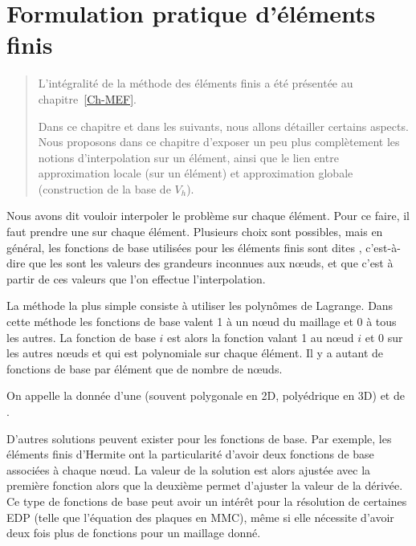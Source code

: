 \chapter{Formulation pratique d'éléments finis \pln}\label{Ch-Elts}
\begin{abstract}
L'intégralité de la méthode des éléments finis a été présentée au chapitre~\ref{Ch-MEF}.

Dans ce chapitre et dans les suivants, nous allons détailler certains aspects.
Nous proposons dans ce chapitre d'exposer un peu plus complètement les notions
d'interpolation sur un élément, ainsi que le lien entre approximation locale
(sur un élément) et approximation globale (construction de la base de $V_h$).
\end{abstract}


Nous avons dit vouloir interpoler le problème sur chaque élément.
Pour ce faire, il faut prendre une  sur chaque élément.
Plusieurs choix sont possibles, mais en général, les fonctions de base utilisées pour les
éléments finis sont dites , c'est-à-dire que les
 sont les valeurs des grandeurs inconnues aux nœuds,
et que c'est à partir de ces valeurs que l'on effectue l'interpolation.

\medskip
La méthode la plus simple consiste à utiliser les polynômes de Lagrange.
Dans cette méthode les fonctions de base valent 1 à un nœud du maillage et 0 à tous les autres.
La fonction de base $i$ est alors la fonction valant 1 au nœud $i$ et 0 sur les autres nœuds
et qui est polynomiale sur chaque élément.
Il y a autant de fonctions de base par élément que de nombre de nœuds.

On appelle  la donnée d'une 
(souvent polygonale en 2D, polyédrique en 3D) et de .

\medskip
D'autres solutions peuvent exister pour les fonctions de base.
Par exemple, les éléments finis d'Hermite
ont la particularité d'avoir deux fonctions de base associées à chaque nœud.
La valeur de la solution est alors ajustée avec la première fonction alors que la deuxième
permet d'ajuster la valeur de la dérivée.
Ce type de fonctions de base peut avoir un intérêt pour la résolution de certaines EDP
(telle que l'équation des plaques en MMC), même si elle nécessite d'avoir deux fois plus
de fonctions pour un maillage donné.








